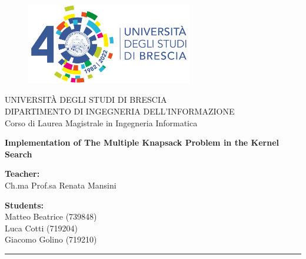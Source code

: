 \begin{titlepage}
    \begin{figure}[H] %
        \centering
        \includegraphics[width=72.4mm]{images/logo_unibs}
    \end{figure}

    \begin{center}
        \LARGE{\uppercase{Università degli Studi di Brescia}}\\ %
        \vspace{5mm} %
        \large{\uppercase{Dipartimento di Ingegneria dell'informazione}}\\
        \vspace{5mm}
        \large{Corso di Laurea Magistrale in Ingegneria Informatica}\\
    \end{center}

    \vspace{10mm}

    \begin{center}
        \LARGE{\textbf{Implementation of The Multiple Knapsack Problem in the Kernel Search}}\\
    \end{center}

    \vspace{10mm}

    \begin{flushleft}
        \large
        \textbf{Teacher:}\\
        Ch.ma Prof.sa Renata Mansini
    \end{flushleft}

    \begin{flushright}
        \large
        \textbf{Students:}\\
        Matteo Beatrice (739848)\\
        Luca Cotti (719204)\\
        Giacomo Golino (719210)
    \end{flushright}

    \vspace*{\fill} %

    \rule{0.8\textwidth}{0.6pt}\\ %
\end{titlepage}